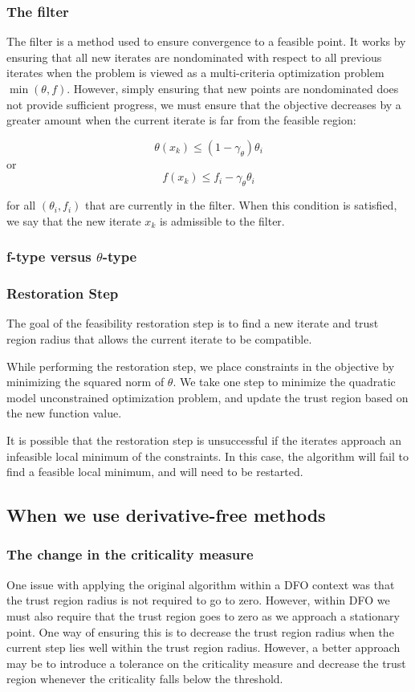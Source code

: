\documentclass{article} %
\begin{document}
\subsubsection{The filter}

The filter is a method used to ensure convergence to a feasible point.
It works by ensuring that all new iterates are nondominated with respect to all previous iterates when the problem is viewed as a multi-criteria optimization problem $\min (\theta, f)$. However, simply ensuring that new points are nondominated does not provide sufficient progress, we must ensure that the objective decreases by a greater amount when the current iterate is far from the feasible region:

\[
\theta(x_k) \le (1-\gamma_{\theta})\theta_i
\]
or
\[
f(x_k) \le f_i -\gamma_{\theta}\theta_i
\]

for all $(\theta_i, f_i)$ that are currently in the filter.
When this condition is satisfied, we say that the new iterate $x_k$ is admissible to the filter.

\subsubsection{f-type versus $\theta$-type}


\subsubsection{Restoration Step}

The goal of the feasibility restoration step is to find a new iterate and trust region radius that allows the current iterate to be compatible.

While performing the restoration step, we place constraints in the objective by minimizing the squared norm of $\theta$.
We take one step to minimize the quadratic model unconstrained optimization problem, and update the trust region based on the new function value.

It is possible that the restoration step is unsuccessful if the iterates approach an infeasible local minimum of the constraints.
In this case, the algorithm will fail to find a feasible local minimum, and will need to be restarted.


\subsection{When we use derivative-free methods}

\subsubsection{The change in the criticality measure}
One issue with applying the original algorithm within a DFO context was that the trust region radius is not required to go to zero. However, within DFO we must also require that the trust region goes to zero as we approach a stationary point. One way of ensuring this is to decrease the trust region radius when the current step lies well within the trust region radius. However, a better approach may be to introduce a tolerance on the criticality measure and decrease the trust region whenever the criticality falls below the threshold.
\end{document}
